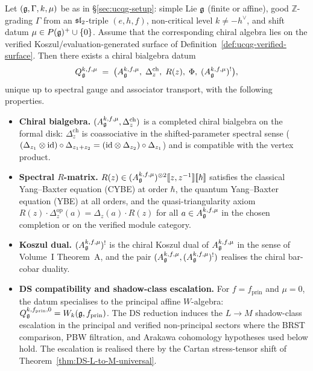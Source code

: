 \begin{theorem}
\label{thm:unified-chiral-QG}%
Let $(\mathfrak{g}, \Gamma, k, \mu)$ be as in
\S\ref{sec:ucqg-setup}: simple Lie $\mathfrak{g}$ (finite or affine), good
$\mathbb{Z}$-grading $\Gamma$ from an $\mathfrak{sl}_2$-triple $(e,h,f)$,
non-critical level $k\neq -h^{\vee}$, and shift datum
$\mu \in P(\mathfrak{g})^{+}\cup\{0\}$. Assume that the corresponding chiral
algebra lies on the verified Koszul/evaluation-generated surface of
Definition~\ref{def:ucqg-verified-surface}. Then there exists a
chiral bialgebra datum
\[
 Q_{\mathfrak{g}}^{k,f,\mu}
 \;=\; \bigl(A_{\mathfrak{g}}^{k,f,\mu},\;\Delta^{\mathrm{ch}}_z,\;R(z),\;\Phi,\;
 (A_{\mathfrak{g}}^{k,f,\mu})^{!}\bigr),
\]
unique up to spectral gauge and associator transport, with the
following properties.
\begin{itemize}
\item[(i)] \textbf{Chiral bialgebra.}
$(A_{\mathfrak{g}}^{k,f,\mu}, \Delta^{\mathrm{ch}}_z)$ is a completed chiral
bialgebra on the formal disk: $\Delta^{\mathrm{ch}}_z$ is
coassociative in the shifted-parameter spectral sense (
$(\Delta_{z_1}\otimes \mathrm{id})\circ \Delta_{z_1+z_2}
= (\mathrm{id}\otimes \Delta_{z_2})\circ \Delta_{z_1}$) and is
compatible with the vertex product.

\item[(ii)] \textbf{Spectral $R$-matrix.}
$R(z)\in (A_{\mathfrak{g}}^{k,f,\mu})^{\otimes 2}[\![z,z^{-1}]\!][\![\hbar]\!]$
satisfies the classical Yang--Baxter equation (CYBE) at order $\hbar$,
the quantum Yang--Baxter equation (YBE) at all orders, and the
quasi-triangularity axiom
$R(z)\cdot \Delta_z^{\mathrm{op}}(a) = \Delta_z(a)\cdot R(z)$ for all
$a\in A_{\mathfrak{g}}^{k,f,\mu}$ in the chosen completion or on the verified
module category.

\item[(iii)] \textbf{Koszul dual.}
$(A_{\mathfrak{g}}^{k,f,\mu})^{!}$ is the chiral Koszul dual of
$A_{\mathfrak{g}}^{k,f,\mu}$ in the sense of Volume~I Theorem~A, and the pair
$(A_{\mathfrak{g}}^{k,f,\mu}, (A_{\mathfrak{g}}^{k,f,\mu})^{!})$ realises the chiral
bar-cobar duality.

\item[(iv)] \textbf{DS compatibility and shadow-class escalation.}
For $f = f_{\mathrm{prin}}$ and $\mu = 0$, the datum specialises to the
principal affine $W$-algebra:
$Q_{\mathfrak{g}}^{k,f_{\mathrm{prin}},0}=W_k(\mathfrak{g}, f_{\mathrm{prin}})$. The
DS reduction induces the $L\to M$ shadow-class escalation in the
principal and verified non-principal sectors where the BRST comparison,
PBW filtration, and Arakawa cohomology hypotheses used below hold. The
escalation is realised there by the Cartan stress-tensor shift of
Theorem~\ref{thm:DS-L-to-M-universal}.
\end{itemize}
\end{theorem}

